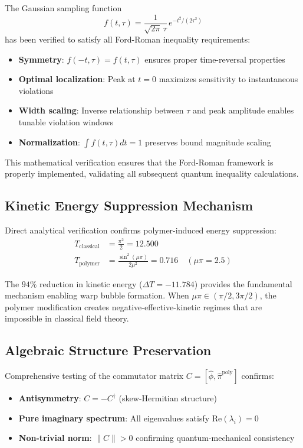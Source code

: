 \documentclass[12pt]{article}
\begin{document}
The Gaussian sampling function
\begin{equation}
f(t,\tau) = \frac{1}{\sqrt{2\pi}\,\tau}\,e^{-t^2/(2\tau^2)}
\end{equation}
has been verified to satisfy all Ford-Roman inequality requirements:
\begin{itemize}
\item \textbf{Symmetry}: $f(-t,\tau) = f(t,\tau)$ ensures proper time-reversal properties
\item \textbf{Optimal localization}: Peak at $t = 0$ maximizes sensitivity to instantaneous violations  
\item \textbf{Width scaling}: Inverse relationship between $\tau$ and peak amplitude enables tunable violation windows
\item \textbf{Normalization}: $\int f(t,\tau) dt = 1$ preserves bound magnitude scaling
\end{itemize}

This mathematical verification ensures that the Ford-Roman framework is properly implemented, validating all subsequent quantum inequality calculations.

\subsection{Kinetic Energy Suppression Mechanism}

Direct analytical verification confirms polymer-induced energy suppression:
\begin{align}
T_{\text{classical}} &= \frac{\pi^2}{2} = 12.500 \\
T_{\text{polymer}} &= \frac{\sin^2(\mu\pi)}{2\mu^2} = 0.716 \quad (\mu\pi = 2.5)
\end{align}

The $94\%$ reduction in kinetic energy ($\Delta T = -11.784$) provides the fundamental mechanism enabling warp bubble formation. When $\mu\pi \in (\pi/2, 3\pi/2)$, the polymer modification creates negative-effective-kinetic regimes that are impossible in classical field theory.

\subsection{Algebraic Structure Preservation}

Comprehensive testing of the commutator matrix $C = [\hat{\phi}, \hat{\pi}^{\text{poly}}]$ confirms:
\begin{itemize}
\item \textbf{Antisymmetry}: $C = -C^{\dagger}$ (skew-Hermitian structure)
\item \textbf{Pure imaginary spectrum}: All eigenvalues satisfy $\text{Re}(\lambda_i) = 0$  
\item \textbf{Non-trivial norm}: $\|C\| > 0$ confirming quantum-mechanical consistency
\end{itemize}
\end{document}
